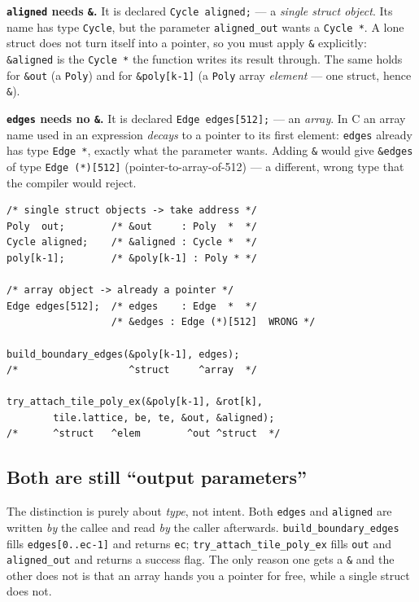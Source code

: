 \documentclass[10pt,a4paper]{article}
\let\polysubsection\subsection
\renewcommand\subsection{\needspace{0.12\textheight}\polysubsection}
\newcommand{\code}[1]{\texttt{\small #1}}
\newcommand{\panegap}{\hfill}
\begin{document}
\par\medskip\noindent
\begin{minipage}[t]{0.46\linewidth}
\setlength{\parskip}{4pt}
\textbf{\code{aligned} needs \code{\&}.}  It is declared
\code{Cycle aligned;} — a \emph{single struct object}.  Its name has type
\code{Cycle}, but the parameter \code{aligned\_out} wants a \code{Cycle *}.
A lone struct does not turn itself into a pointer, so you must apply
\code{\&} explicitly: \code{\&aligned} is the \code{Cycle *} the function
writes its result through.  The same holds for \code{\&out} (a \code{Poly})
and for \code{\&poly[k-1]} (a \code{Poly} array \emph{element} — one
struct, hence \code{\&}).

\textbf{\code{edges} needs no \code{\&}.}  It is declared
\code{Edge edges[512];} — an \emph{array}.  In C an array name used in an
expression \emph{decays} to a pointer to its first element: \code{edges}
already has type \code{Edge *}, exactly what the parameter wants.  Adding
\code{\&} would give \code{\&edges} of type \code{Edge (*)[512]}
(pointer-to-array-of-512) — a different, wrong type that the compiler
would reject.
\end{minipage}\panegap
\begin{minipage}[t]{0.50\linewidth}
\begin{verbatim}
/* single struct objects -> take address */
Poly  out;        /* &out     : Poly  *  */
Cycle aligned;    /* &aligned : Cycle *  */
poly[k-1];        /* &poly[k-1] : Poly * */

/* array object -> already a pointer */
Edge edges[512];  /* edges    : Edge  *  */
                  /* &edges : Edge (*)[512]  WRONG */

build_boundary_edges(&poly[k-1], edges);
/*                   ^struct     ^array  */

try_attach_tile_poly_ex(&poly[k-1], &rot[k],
        tile.lattice, be, te, &out, &aligned);
/*      ^struct   ^elem        ^out ^struct  */
\end{verbatim}
\end{minipage}
\par\medskip

\subsection{Both are still ``output parameters''}

The distinction is purely about \emph{type}, not intent.  Both \code{edges}
and \code{aligned} are written \emph{by} the callee and read \emph{by} the
caller afterwards.  \code{build\_boundary\_edges} fills \code{edges[0..ec-1]}
and returns \code{ec}; \code{try\_attach\_tile\_poly\_ex} fills \code{*out}
and \code{*aligned\_out} and returns a success flag.  The only reason one
gets a \code{\&} and the other does not is that an array hands you a pointer
for free, while a single struct does not.
\end{document}
